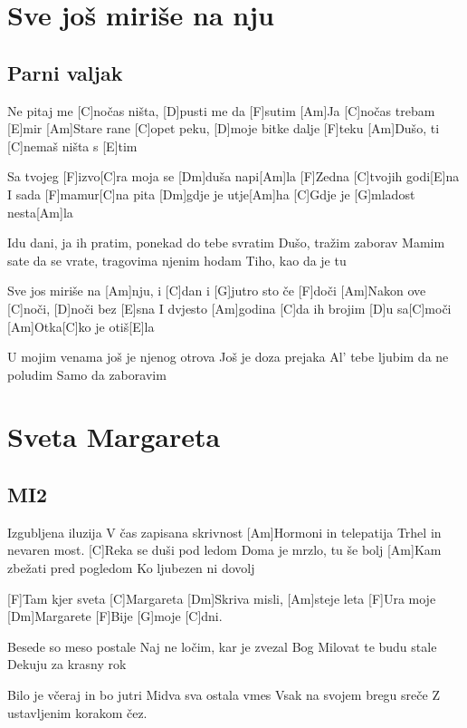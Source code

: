 \documentclass[a4paper,12pt]{article}
\begin{document}
\begin{multicols}{2}
\begin{guitar}
\end{guitar}
\section{Sve još miriše na nju}
\subsection*{Parni valjak}
\begin{guitar}
[Am]Ne pitaj me [C]nočas ništa, 
[D]pusti me da [F]sutim
[Am]Ja [C]nočas trebam [E]mir
[Am]Stare rane [C]opet peku, 
[D]moje bitke dalje [F]teku
[Am]Dušo, ti [C]nemaš ništa s [E]tim


Sa tvojeg [F]izvo[C]ra moja se [Dm]duša napi[Am]la
[F]Zedna [C]tvojih godi[E]na
I sada [F]mamur[C]na pita [Dm]gdje je utje[Am]ha
[C]Gdje je [G]mladost nesta[Am]la

     
Idu dani, ja ih pratim, ponekad do tebe svratim
Dušo, tražim zaborav
Mamim sate da se vrate, tragovima njenim hodam
Tiho, kao da je tu


Sve jos miriše na [Am]nju, 
i [C]dan i [G]jutro sto če [F]doči
[Am]Nakon ove [C]noči, [D]noči bez [E]sna
I dvjesto [Am]godina 
[C]da ih brojim [D]u sa[C]moči
[Am]Otka[C]ko je otiš[E]la


U mojim venama još je njenog otrova
Još je doza prejaka
Al' tebe ljubim da ne poludim
Samo da zaboravim

\end{guitar}
\section{Sveta Margareta}
\subsection*{MI2}
\begin{guitar}
[C]Izgubljena iluzija                         
V čas zapisana skrivnost
[Am]Hormoni in telepatija
Trhel in nevaren most.
[C]Reka se duši pod ledom
Doma je mrzlo, tu še bolj
[Am]Kam zbežati pred pogledom
Ko ljubezen ni dovolj


[F]Tam kjer sveta [C]Margareta
[Dm]Skriva misli, [Am]steje leta
[F]Ura moje [Dm]Margarete
[F]Bije  [G]moje  [C]dni.


Besede so meso postale
Naj ne ločim, kar je zvezal Bog
Milovat te budu stale
Dekuju za krasny rok


Bilo je včeraj in bo jutri
Midva sva ostala vmes
Vsak na svojem bregu sreče
Z ustavljenim korakom čez.



\end{guitar}
\end{multicols}
\end{document}

